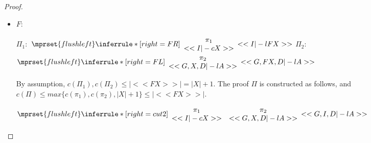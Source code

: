 \begin{proof}
\begin{enumerate}
\begin{itemize}
    \item $F$:
      \begin{center}
        \scriptsize
        $\Pi_1:$
        \begin{math}
          $$\mprset{flushleft}
          \inferrule* [right={\tiny FR}] {
            {
              \begin{array}{c}
                \pi_1 \\
                {<<I |-c X>>}
              \end{array}
            }
          }{<<I |-l F X>>}
        \end{math}
        \qquad\qquad
        $\Pi_2:$
        \begin{math}
          $$\mprset{flushleft}
          \inferrule* [right={\tiny FL}] {
            {
              \begin{array}{c}
                \pi_2 \\
                {<<G, X, D |-l A>>}
              \end{array}
            }
          }{<<G, F X, D |-l A>>}
        \end{math}
      \end{center}
      By assumption, $c(\Pi_1),c(\Pi_2)\leq |<<F X>>| = |X|+1$. The proof $\Pi$ is
      constructed as follows, and $c(\Pi)\leq max\{c(\pi_1),c(\pi_2),|X|+1\}\leq |<<F X>>|$.
      \begin{center}
        \scriptsize
        \begin{math}
          $$\mprset{flushleft}
          \inferrule* [right={\tiny cut2}] {
            {
              \begin{array}{cc}
                \pi_1 & \pi_2 \\
                {<<I |-c X>>} & {<<G, X, D |-l A>>}
              \end{array}
            }
          }{<<G, I, D |-l A>>}
        \end{math}
      \end{center}


\end{itemize}
\end{enumerate}
\end{proof}
